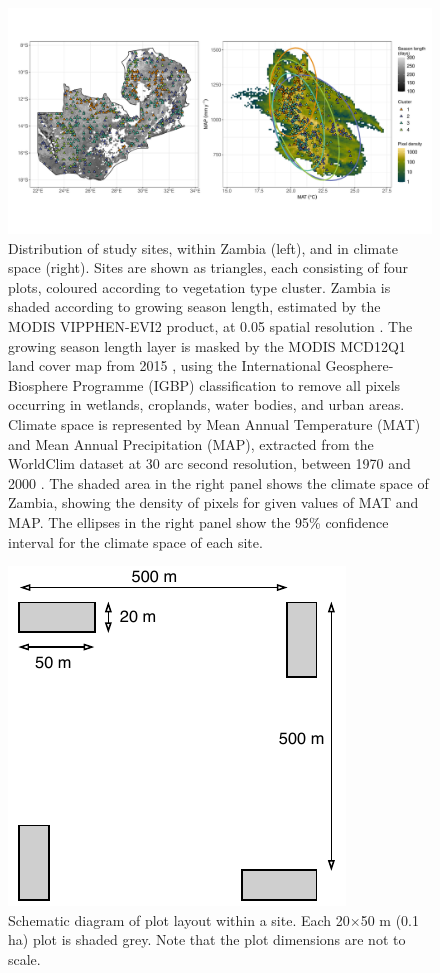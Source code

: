 \begin{refsection}
\begin{figure}
	\includegraphics[width=\linewidth]{img/plot_loc_clim}
	\caption[Map of study sites in Zambia]{Distribution of study sites, within Zambia (left), and in climate space (right). Sites are shown as triangles, each consisting of four plots, coloured according to vegetation type cluster. Zambia is shaded according to growing season length, estimated by the MODIS VIPPHEN-EVI2 product, at 0.05\textdegree{} spatial resolution \citep{VIPPHEN}. The growing season length layer is masked by the MODIS MCD12Q1 land cover map from 2015 \citep{MCD12Q1}, using the International Geosphere-Biosphere Programme (IGBP) classification to remove all pixels occurring in wetlands, croplands, water bodies, and urban areas. Climate space is represented by Mean Annual Temperature (MAT) and Mean Annual Precipitation (MAP), extracted from the WorldClim dataset at 30 arc second resolution, between 1970 and 2000 \citep{Fick2017}. The shaded area in the right panel shows the climate space of Zambia, showing the density of pixels for given values of MAT and MAP. The ellipses in the right panel show the 95\% confidence interval for the climate space of each site.} 
	\label{phen:plot_loc_clim}
\end{figure}

\begin{landscape}

\end{landscape}

\begin{figure}
	\includegraphics[width=0.5\linewidth]{img/schematic}
	\caption[Schematic diagram of plot layout within a site]{Schematic diagram of plot layout within a site. Each 20$\times$50 m (0.1 ha) plot is shaded grey. Note that the plot dimensions are not to scale.}
	\label{phen:schematic}
\end{figure}


\end{refsection}
